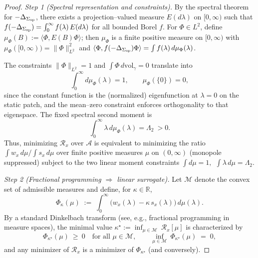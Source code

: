 \documentclass[10pt]{article}
\theoremstyle{definition}
\theoremstyle{plain}
\begin{document}
\begin{proof}
\emph{Step 1 (Spectral representation and constraints).}
By the spectral theorem for $-\Delta_{\Sigma_{\rm sp}}$, there exists a projection--valued measure
$E(d\lambda)$ on $[0,\infty)$ such that $f(-\Delta_{\Sigma_{\rm sp}})=\int_0^\infty f(\lambda)\,E(d\lambda)$
for all bounded Borel $f$. For $\Phi\in L^2$, define $\mu_\Phi(B):=\langle \Phi,E(B)\Phi\rangle$; then
$\mu_\Phi$ is a finite positive measure on $[0,\infty)$ with $\mu_\Phi([0,\infty))=\|\Phi\|_{L^2}^2$ and
$\langle \Phi,f(-\Delta_{\Sigma_{\rm sp}})\Phi\rangle=\int f(\lambda)\,d\mu_\Phi(\lambda)$.

The constraints $\|\Phi\|_{L^2}=1$ and $\int \Phi\,d\mathrm{vol}_\gamma=0$ translate into
\[
\int_0^\infty d\mu_\Phi(\lambda)=1,\qquad \mu_\Phi(\{0\})=0,
\]
since the constant function is the (normalized) eigenfunction at $\lambda=0$ on the static patch, and
the mean--zero constraint enforces orthogonality to that eigenspace. The fixed spectral second moment is
\[
\int_0^\infty \lambda\,d\mu_\Phi(\lambda)=\Lambda_2\ > 0.
\]
Thus, minimizing $\mathcal R_x$ over $\mathcal A$ is equivalent to minimizing the ratio
$\int w_x\,d\mu / \int s_x\,d\mu$ over finite positive measures $\mu$ on $(0,\infty)$ (monopole suppressed)
subject to the two linear moment constraints
\(
\int d\mu=1,\ \ \int \lambda\,d\mu=\Lambda_2.
\)

\smallskip
\emph{Step 2 (Fractional programming $\Rightarrow$ linear surrogate).}
Let $\mathcal M$ denote the convex set of admissible measures and define, for $\kappa\in\mathbb R$,
\[
\Phi_\kappa(\mu)\;:=\;\int_0^\infty \bigl(w_x(\lambda)-\kappa\,s_x(\lambda)\bigr)\,d\mu(\lambda).
\]
By a standard Dinkelbach transform (see, e.g., fractional programming in measure spaces), the minimal value
$\kappa^\star:=\inf_{\mu\in\mathcal M}\ \mathcal R_x[\mu]$ is characterized by
\begin{equation}
\label{eq:dink}
\Phi_{\kappa^\star}(\mu)\ \ge\ 0\quad \text{for all }\mu\in\mathcal M,\qquad \inf_{\mu\in\mathcal M}\ \Phi_{\kappa^\star}(\mu)\;=\;0,
\end{equation}
and any minimizer of $\mathcal R_x$ is a minimizer of $\Phi_{\kappa^\star}$ (and conversely).


\end{proof}
\end{document}
